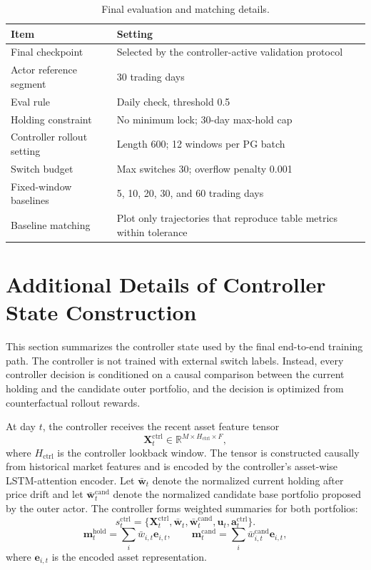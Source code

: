 \documentclass[letterpaper]{article} %
\begin{document}
\begin{table}[t]
\centering
\caption{Final evaluation and matching details.}
\label{tab:eval_protocol}
\footnotesize
\setlength{\tabcolsep}{3pt}
\begin{tabular}{p{}p{}}
\toprule
\textbf{Item} & \textbf{Setting} \\
\midrule
Final checkpoint & Selected by the controller-active validation protocol \\
Actor reference segment & 30 trading days \\
Eval rule & Daily check, threshold 0.5 \\
Holding constraint & No minimum lock; 30-day max-hold cap \\
Controller rollout setting & Length 600; 12 windows per PG batch \\
Switch budget & Max switches 30; overflow penalty 0.001 \\
Fixed-window baselines & 5, 10, 20, 30, and 60 trading days \\
Baseline matching & Plot only trajectories that reproduce table metrics within tolerance \\
\bottomrule
\end{tabular}
\end{table}

\section{Additional Details of Controller State Construction}
\label{app:ctrl_state}

This section summarizes the controller state used by the final end-to-end training path. The controller is not trained with external switch labels. Instead, every controller decision is conditioned on a causal comparison between the current holding and the candidate outer portfolio, and the decision is optimized from counterfactual rollout rewards.

At day \(t\), the controller receives the recent asset feature tensor
\[
\mathbf{X}^{\mathrm{ctrl}}_t
\in
\mathbb{R}^{M\times H_{\mathrm{ctrl}}\times F},
\]
where \(H_{\mathrm{ctrl}}\) is the controller lookback window. The tensor is constructed causally from historical market features and is encoded by the controller's asset-wise LSTM-attention encoder. Let \(\bar{\mathbf{w}}_t\) denote the normalized current holding after price drift and let \(\bar{\mathbf{w}}_t^{\mathrm{cand}}\) denote the normalized candidate base portfolio proposed by the outer actor. The controller forms weighted summaries for both portfolios:
\[
s_t^{\mathrm{ctrl}}
=
\{\mathbf{X}_t^{\mathrm{ctrl}},\bar{\mathbf{w}}_t,\bar{\mathbf{w}}_t^{\mathrm{cand}},\mathbf{u}_t,\mathbf{a}_t^{\mathrm{ctrl}}\}.
\]
\[
\mathbf{m}^{\mathrm{hold}}_t
=
\sum_i \bar{w}_{i,t}\mathbf{e}_{i,t},
\qquad
\mathbf{m}^{\mathrm{cand}}_t
=
\sum_i \bar{w}_{i,t}^{\mathrm{cand}}\mathbf{e}_{i,t},
\]
where \(\mathbf{e}_{i,t}\) is the encoded asset representation.
\end{document}
